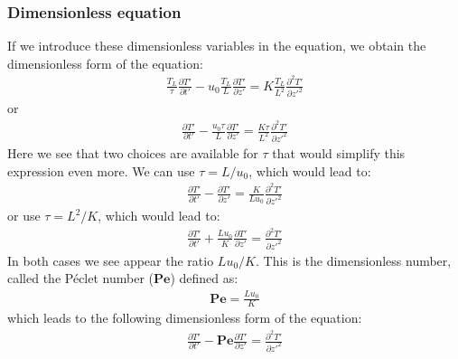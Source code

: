 \documentclass[letterpaper,10pt,english]{jupyterBook}
\begin{document}
\subsubsection{Dimensionless equation}
\label{\detokenize{diffusion-advection:dimensionless-equation}}
\sphinxAtStartPar
If we introduce these dimensionless variables in the equation, we obtain the dimensionless form of the equation:
\begin{equation*}
\begin{split}\frac{T_L}{\tau}\frac{\partial T'}{\partial t'}-u_0\frac{T_L}{L}\frac{\partial T'}{\partial z'}=K\frac{T_L}{L^2}\frac{\partial^2T'}{\partial z'^2}\end{split}
\end{equation*}
\sphinxAtStartPar
or
\begin{equation*}
\begin{split}\frac{\partial T'}{\partial t'}-\frac{u_0\tau}{L}\frac{\partial T'}{\partial z'}=\frac{K\tau}{L^2}\frac{\partial^2T'}{\partial z'^2}\end{split}
\end{equation*}
\sphinxAtStartPar
Here we see that two choices are available for \(\tau\) that would simplify this expression even more. We can use \(\tau=L/u_0\), which would lead to:
\begin{equation*}
\begin{split}\frac{\partial T'}{\partial t'}-\frac{\partial T'}{\partial z'}=\frac{K}{Lu_0}\frac{\partial^2T'}{\partial z'^2}\end{split}
\end{equation*}
\sphinxAtStartPar
or use \(\tau=L^2/K\), which would lead to:
\begin{equation*}
\begin{split}\frac{\partial T'}{\partial t'}+\frac{Lu_0}{K}\frac{\partial T'}{\partial z'}=\frac{\partial^2T'}{\partial z'^2}\end{split}
\end{equation*}
\sphinxAtStartPar
In both cases we see appear the ratio \(Lu_0/K\). This is the dimensionless number, called the Péclet number (\(\mathbf{Pe}\)) defined as:
\begin{equation*}
\begin{split}\mathbf{Pe}=\frac{Lu_0}{K}\end{split}
\end{equation*}
\sphinxAtStartPar
which leads to the following dimensionless form of the equation:
\begin{equation}\label{equation:diffusion-advection:heat-nodim}
\begin{split}\frac{\partial T'}{\partial t'}-\mathbf{Pe}\frac{\partial T'}{\partial z'}=\frac{\partial^2T'}{\partial z'^2}\end{split}
\end{equation}
\end{document}
